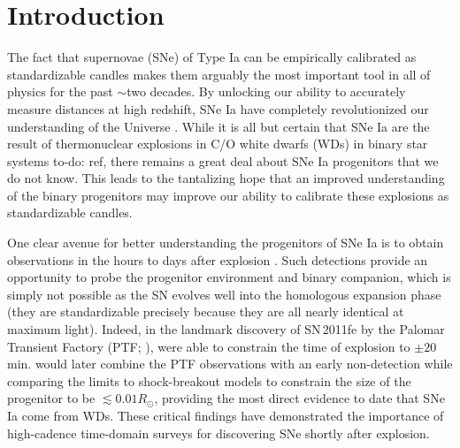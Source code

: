 \documentclass[twocolumn]{./aastex63}
\newcommand{\todo}[1]{{\color{magenta} to-do: {#1}}}
\begin{document}
\section{Introduction}

The fact that supernovae (SNe) of Type Ia can be empirically calibrated as
standardizable candles makes them arguably the most important tool in all of
physics for the past $\sim$two decades. By unlocking our ability to accurately
measure distances at high redshift, SNe Ia have completely revolutionized our
understanding of the Universe \citep{Riess98,Perlmutter99}. While it is all but
certain that SNe Ia are the result of thermonuclear explosions in C/O white
dwarfs (WDs) in binary star systems \citep{} \todo{ref}, there remains a great
deal about SNe Ia progenitors that we do not know. This leads to the tantalizing
hope that an improved understanding of the binary progenitors may improve our
ability to calibrate these explosions as standardizable candles.

One clear avenue for better understanding the progenitors of SNe Ia is to obtain
observations in the hours to days after explosion \citep{Maoz14}. Such
detections provide an opportunity to probe the progenitor environment and binary
companion, which is simply not possible as the SN evolves well into the
homologous expansion phase (they are standardizable precisely because they are
all nearly identical at maximum light). Indeed, in the landmark discovery of
SN\,2011fe by the Palomar Transient Factory (PTF; \citealt{law09,rau09}),
\citet{Nugent11} were able to constrain the time of explosion to $\pm 20$\,min.
\citet{Bloom12a} would later combine the PTF observations with an early
non-detection while comparing the limits to shock-breakout models to constrain
the size of the progenitor to be $\lesssim 0.01 R_\odot$, providing the most
direct evidence to date that SNe Ia come from WDs. These critical findings have
demonstrated the importance of high-cadence time-domain surveys for discovering
SNe shortly after explosion.
\end{document}
